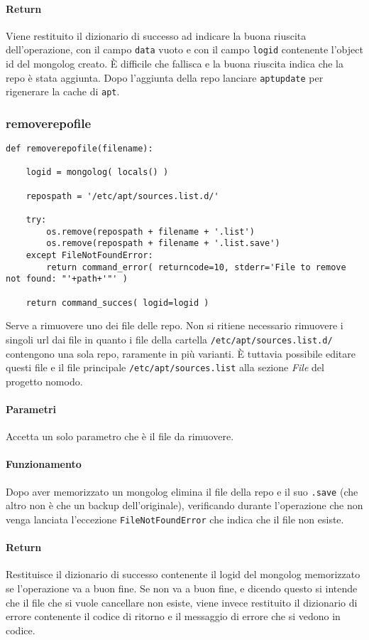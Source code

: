 \documentclass[11pt]{article}
\begin{document}
\paragraph{Return}
Viene restituito il dizionario di successo ad indicare la buona riuscita dell'operazione, con il campo \texttt{data} vuoto
e con il campo \texttt{logid} contenente l'object id del mongolog creato. È difficile che fallisca e la buona riuscita indica
che la repo è stata aggiunta. Dopo l'aggiunta della repo lanciare \texttt{aptupdate} per rigenerare la cache di \texttt{apt}.

\subsubsection{removerepofile}\label{removerepofile}
\begin{lstlisting}
def removerepofile(filename):

    logid = mongolog( locals() )

    repospath = '/etc/apt/sources.list.d/'

    try:
        os.remove(repospath + filename + '.list')
        os.remove(repospath + filename + '.list.save')
    except FileNotFoundError:
        return command_error( returncode=10, stderr='File to remove not found: "'+path+'"' )

    return command_succes( logid=logid )
\end{lstlisting}
Serve a rimuovere uno dei file delle repo. Non si ritiene necessario rimuovere i singoli url dai file in quanto i file
della cartella \texttt{/etc/apt/sources.list.d/} contengono una sola repo, raramente in più varianti. È tuttavia possibile
editare questi file e il file principale \texttt{/etc/apt/sources.list} alla sezione \textit{File} del progetto nomodo.
\paragraph{Parametri}
Accetta un solo parametro che è il file da rimuovere.
\paragraph{Funzionamento}
Dopo aver memorizzato un mongolog elimina il file della repo e il suo \texttt{.save} (che altro non è che un backup
dell'originale), verificando durante l'operazione che non venga lanciata l'eccezione \texttt{FileNotFoundError}
che indica che il file non esiste.
\paragraph{Return}
Restituisce il dizionario di successo contenente il logid del mongolog memorizzato se l'operazione va a buon fine.
Se non va a buon fine, e dicendo questo si intende che il file che si vuole cancellare non esiste, viene invece
restituito il dizionario di errore contenente il codice di ritorno e il messaggio di errore che si vedono in codice.
\end{document}

